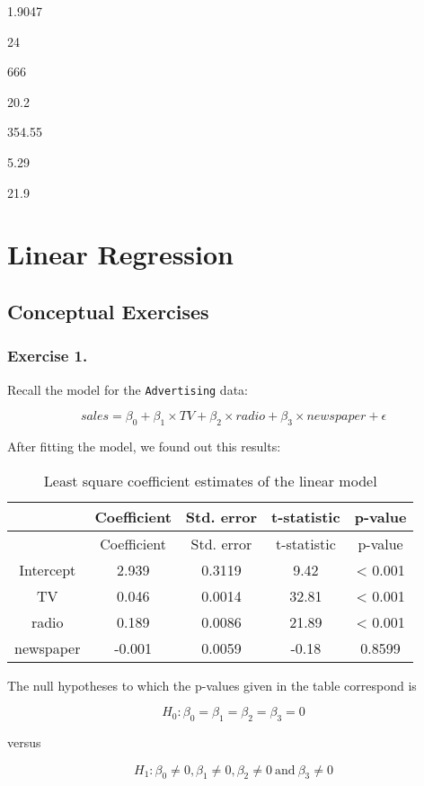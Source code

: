 \documentclass[]{book}
\begin{document}
1.9047

24

666

20.2

354.55

5.29

21.9

\hypertarget{linear-regression}{%
\chapter{Linear Regression}\label{linear-regression}}

\hypertarget{conceptual-exercises-1}{%
\section{Conceptual Exercises}\label{conceptual-exercises-1}}

\hypertarget{exercise-1.-1}{%
\subsection{Exercise 1.}\label{exercise-1.-1}}

Recall the model for the \texttt{Advertising} data:

\[sales = \beta_0 + \beta_1 \times TV + \beta_2 \times radio + \beta_3 \times newspaper + \epsilon\]

After fitting the model, we found out this results:

\begin{longtable}[]{@{}ccccc@{}}
\caption{Least square coefficient estimates of the linear model}\tabularnewline
\toprule
& Coefficient & Std. error & t-statistic & p-value\tabularnewline
\midrule
\endfirsthead
\toprule
& Coefficient & Std. error & t-statistic & p-value\tabularnewline
\midrule
\endhead
Intercept & 2.939 & 0.3119 & 9.42 & \textless{} 0.001\tabularnewline
TV & 0.046 & 0.0014 & 32.81 & \textless{} 0.001\tabularnewline
radio & 0.189 & 0.0086 & 21.89 & \textless{} 0.001\tabularnewline
newspaper & -0.001 & 0.0059 & -0.18 & 0.8599\tabularnewline
\bottomrule
\end{longtable}

The null hypotheses to which the p-values given in the table correspond is

\[H_0 : \beta_0 = \beta_1 = \beta_2 = \beta_3 = 0\]

versus

\[H_1 : \beta_0 \neq 0, \beta_1 \neq 0, \beta_2 \neq 0 ~\text{and}~ \beta_3 \neq 0\]
\end{document}
